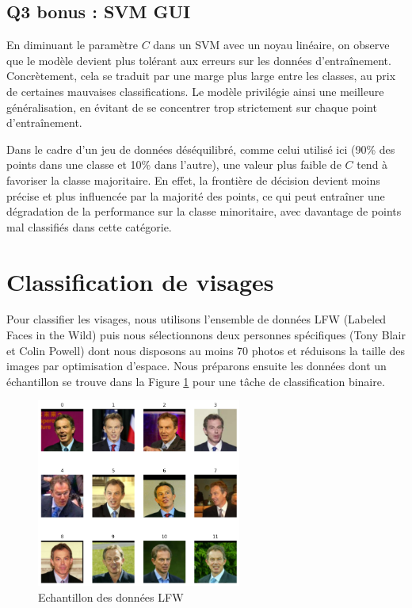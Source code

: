 \documentclass{scrartcl}
\begin{document}
\subsection{Q3 bonus : SVM GUI}

\hspace{7pt} En diminuant le paramètre $C$ dans un SVM avec un noyau linéaire, on observe que le modèle devient plus tolérant aux erreurs sur les données d'entraînement. Concrètement, cela se traduit par une marge plus large entre les classes, au prix de certaines mauvaises classifications. Le modèle privilégie ainsi une meilleure généralisation, en évitant de se concentrer trop strictement sur chaque point d'entraînement.\newline

Dans le cadre d'un jeu de données déséquilibré, comme celui utilisé ici (90\% des points dans une classe et 10\% dans l'autre), une valeur plus faible de $C$ tend à favoriser la classe majoritaire. En effet, la frontière de décision devient moins précise et plus influencée par la majorité des points, ce qui peut entraîner une dégradation de la performance sur la classe minoritaire, avec davantage de points mal classifiés dans cette catégorie.

\section{Classification de visages}

\hspace{7pt} Pour classifier les visages, nous utilisons l'ensemble de données LFW (Labeled Faces in the Wild) puis nous sélectionnons deux personnes spécifiques (Tony Blair et Colin Powell) dont nous disposons au moins 70 photos et réduisons la taille des images par optimisation d'espace. Nous préparons ensuite les données dont un échantillon se trouve dans la Figure \ref{fig:lfw} pour une tâche de classification binaire.

\begin{figure}[h!]
    \centering
    \includegraphics[width=0.6\textwidth]{../images/TB-CP.png}
    \caption{\centering Echantillon des données LFW} 
    \label{fig:lfw}
\end{figure}
\end{document}
